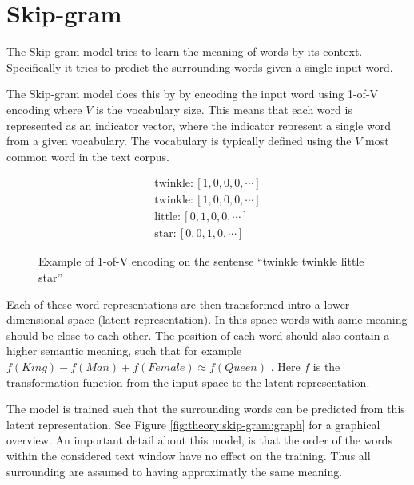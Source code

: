 
\section{Skip-gram}

The Skip-gram model tries to learn the meaning of words by its context. Specifically it tries to predict the surrounding words given a single input word.

The Skip-gram model does this by by encoding the input word using 1-of-V encoding where $V$ is the vocabulary size. This means that each word is represented as an indicator vector, where the indicator represent a single word from a given vocabulary. The vocabulary is typically defined using the $V$ most common word in the text corpus. 
\begin{figure}[h]
\begin{equation*}
\begin{aligned}
\text{twinkle}: \left[1, 0, 0, 0, \cdots \right] \\
\text{twinkle}: \left[1, 0, 0, 0, \cdots \right] \\
\text{little}: \left[0, 1, 0, 0, \cdots \right] \\
\text{star}: \left[0, 0, 1, 0, \cdots \right]
\end{aligned}
\end{equation*}
\caption{Example of 1-of-V encoding on the sentense ``twinkle twinkle little star''}
\end{figure}

Each of these word representations are then transformed intro a lower dimensional space (latent representation). In this space words with same meaning should be close to each other. The position of each word should also contain a higher semantic meaning, such that for example $f(King) - f(Man) + f(Female) \approx f(Queen)$ \cite{word2vec-comparing}. Here $f$ is the transformation function from the input space to the latent representation.

The model is trained such that the surrounding words can be predicted from this latent representation. See Figure \ref{fig:theory:skip-gram:graph} for a graphical overview. An important detail about this model, is that the order of the words within the considered text window have no effect on the training. Thus all surrounding are assumed to having approximatly the same meaning.

